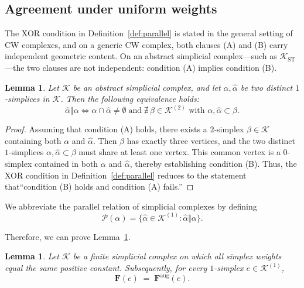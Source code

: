 \documentclass[
    pre,
    twocolumn,
    superscriptaddress,
    showpacs,
    nofootinbib,
    amsmath,
    amssymb,
    floatfix
]{revtex4-2}
\newcommand{\K}{\mathcal{K}}
\newcommand{\F}{\mathbf{F}}        %
\newcommand{\Faug}{\F^{\mathrm{aug}}}
\theoremstyle{plain} %
\newtheorem{lemma}[theorem]{\indent Lemma}
\theoremstyle{definition} %
\begin{document}
\subsection{Agreement under uniform weights}\label{ssec:agreement}

The XOR condition in Definition~\ref{def:parallel} is stated in the general setting of CW complexes, and on a generic CW complex, both clauses (A) and (B) carry independent geometric content.
On an abstract simplicial complex---such as $\K_{\mathrm{ST}}$---the two clauses are not independent: condition (A) implies condition (B).

\begin{lemma}\label{lem:reduction}
Let $\K$ be an abstract simplicial complex, and let $\alpha,\hat\alpha$ be two distinct $1$-simplices in $\K$.
Then the following equivalence holds:
\begin{equation*}
    \hat\alpha\Vert\alpha
    \iff
    \alpha\cap\hat\alpha\neq\emptyset
    \;\text{and}\;
    \nexists\, \beta\in\K^{(2)}\text{ with }\alpha,\hat\alpha\subset\beta.
\end{equation*}
\end{lemma}
\begin{proof}
Assuming that condition (A) holds, there exists a $2$-simplex $\beta\in\K$ containing both $\alpha$ and $\hat\alpha$.
Then $\beta$ has exactly three vertices, and the two distinct $1$-simplices $\alpha,\hat\alpha\subset\beta$ must share at least one vertex.
This common vertex is a $0$-simplex contained in both $\alpha$ and $\hat\alpha$, thereby establishing condition (B).
Thus, the XOR condition in Definition~\ref{def:parallel} reduces to the statement that``condition (B) holds and condition (A) fails.''
\end{proof}

We abbreviate the parallel relation of simplicial complexes by defining
\begin{equation}
    \mathcal{P}(\alpha)
    = \bigl\{\hat\alpha\in\K^{(1)} :
            \hat\alpha\Vert\alpha\bigr\}.
\end{equation}

Therefore, we can prove Lemma~\ref{lem:agreement}.

\begin{lemma}\label{lem:agreement}
Let $\K$ be a finite simplicial complex on which all simplex weights equal the same positive constant.
Subsequently, for every $1$-simplex $e\in\K^{(1)}$,
\begin{equation*}
    \F(e) \;=\; \Faug(e).
\end{equation*}
\end{lemma}
\end{document}
